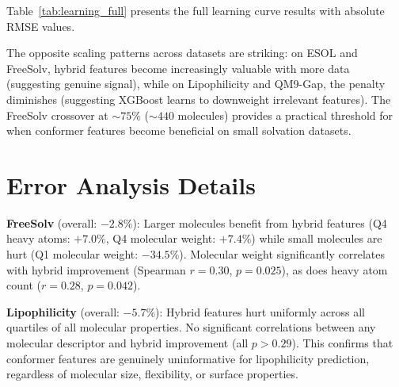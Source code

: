 \documentclass[sigconf]{acmart}
\begin{document}
Table~\ref{tab:learning_full} presents the full learning curve results with absolute RMSE values.

\begin{table}[ht]
\caption{Learning curves: absolute RMSE (mean of 3 seeds) at each training fraction.}
\label{tab:learning_full}
\centering
{}
\end{table}

The opposite scaling patterns across datasets are striking: on ESOL and FreeSolv, hybrid features become increasingly valuable with more data (suggesting genuine signal), while on Lipophilicity and QM9-Gap, the penalty diminishes (suggesting XGBoost learns to downweight irrelevant features). The FreeSolv crossover at ${\sim}75\%$ (${\sim}440$ molecules) provides a practical threshold for when conformer features become beneficial on small solvation datasets.

\section{Error Analysis Details}
\label{app:error}

\textbf{FreeSolv} (overall: $-2.8\%$): Larger molecules benefit from hybrid features (Q4 heavy atoms: $+7.0\%$, Q4 molecular weight: $+7.4\%$) while small molecules are hurt (Q1 molecular weight: $-34.5\%$). Molecular weight significantly correlates with hybrid improvement (Spearman $r = 0.30$, $p = 0.025$), as does heavy atom count ($r = 0.28$, $p = 0.042$).

\textbf{Lipophilicity} (overall: $-5.7\%$): Hybrid features hurt uniformly across all quartiles of all molecular properties. No significant correlations between any molecular descriptor and hybrid improvement (all $p > 0.29$). This confirms that conformer features are genuinely uninformative for lipophilicity prediction, regardless of molecular size, flexibility, or surface properties.
\end{document}
